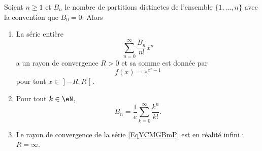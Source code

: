 \begin{theorem}  \label{ThoYFAzwSg}
    Soient \( n\geq 1\) et \( B_n\) le nombre de partitions distinctes de l'ensemble \( \{ 1,\ldots, n \}\) avec la convention que \( B_0=0\). Alors
    \begin{enumerate}
        \item
            La série entière
            \begin{equation}    \label{EqYCMGBmP}
                \sum_{n=0}^{\infty}\frac{ B_n }{ n! }x^n
            \end{equation}
            a un rayon de convergence \( R>0\) et sa somme est donnée par
            \begin{equation}
                f(x)= e^{ e^{x}-1}
            \end{equation}
            pour tout \( x\in\mathopen] -R , R \mathclose[\).
        \item
            Pour tout \( k\in \eN\),
            \begin{equation}
                B_n=\frac{1}{ e }\sum_{k=0}^{\infty}\frac{ k^n }{ k! }.
            \end{equation}
            \item
                Le rayon de convergence de la série \eqref{EqYCMGBmP} est en réalité infini : \( R=\infty\).
    \end{enumerate}
\end{theorem}

